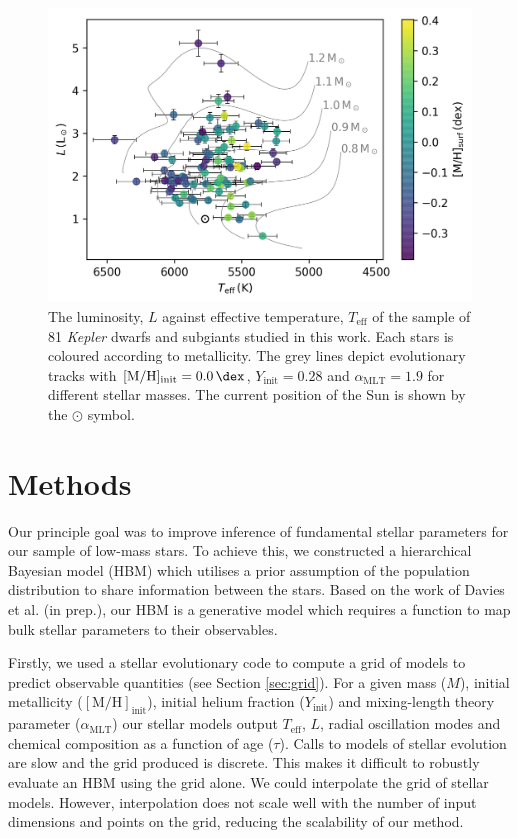 \documentclass[a4paper,fleqn,usenatbib]{mnras}
\newcommand{\metallicity}{\ensuremath{[\mathrm{M}/\mathrm{H}]}}
\newcommand{\teff}{\ensuremath{T_\mathrm{eff}}}
\newcommand{\mlt}{\ensuremath{{\alpha_\mathrm{MLT}}}}
\begin{document}
\begin{figure}
    \centering
    \includegraphics[width=\linewidth]{figures/context.png}
    \caption{The luminosity, $L$ against effective temperature, $\teff$ of the sample of 81 \emph{Kepler} dwarfs and subgiants studied in this work. Each stars is coloured according to metallicity. The grey lines depict evolutionary tracks with $\metallicity_\mathrm{init}=\SI{0.0}{\dex}$, $Y_\mathrm{init}=0.28$ and $\mlt=1.9$ for different stellar masses. The current position of the Sun is shown by the $\odot$ symbol.}
    \label{fig:data}
\end{figure}

\section{Methods}\label{sec:meth}


Our principle goal was to improve inference of fundamental stellar parameters for our sample of low-mass stars. To achieve this, we constructed a hierarchical Bayesian model (HBM) which utilises a prior assumption of the population distribution to share information between the stars. Based on the work of Davies et al. (in prep.), our HBM is a generative model which requires a function to map bulk stellar parameters to their observables.

Firstly, we used a stellar evolutionary code to compute a grid of models to predict observable quantities (see Section \ref{sec:grid}). For a given mass ($M$), initial metallicity ($\metallicity_\mathrm{init}$), initial helium fraction ($Y_\mathrm{init}$) and mixing-length theory parameter ($\mlt$) our stellar models output $\teff$, $L$, radial oscillation modes and chemical composition as a function of age ($\tau$). Calls to models of stellar evolution are slow and the grid produced is discrete. This makes it difficult to robustly evaluate an HBM using the grid alone. We could interpolate the grid of stellar models. However, interpolation does not scale well with the number of input dimensions and points on the grid, reducing the scalability of our method.
\end{document}

